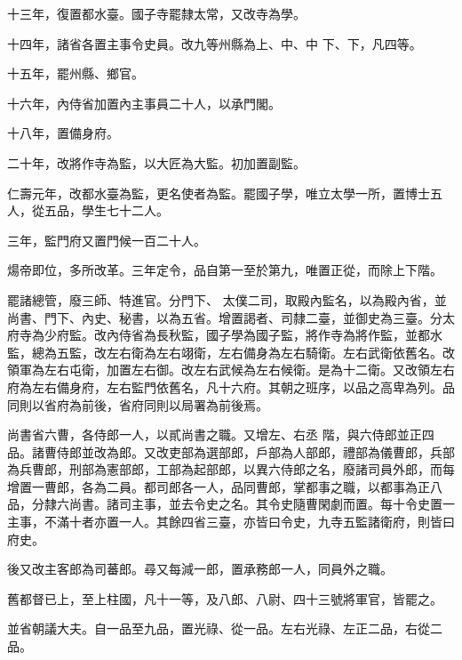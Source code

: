 \begin{pinyinscope}
 十三年，復置都水臺。國子寺罷隸太常，又改寺為學。



 十四年，諸省各置主事令史員。改九等州縣為上、中、中
 下、下，凡四等。



 十五年，罷州縣、鄉官。



 十六年，內侍省加置內主事員二十人，以承門閣。



 十八年，置備身府。



 二十年，改將作寺為監，以大匠為大監。初加置副監。



 仁壽元年，改都水臺為監，更名使者為監。罷國子學，唯立太學一所，置博士五人，從五品，學生七十二人。



 三年，監門府又置門候一百二十人。



 煬帝即位，多所改革。三年定令，品自第一至於第九，唯置正從，而除上下階。



 罷諸總管，廢三師、特進官。分門下、
 太僕二司，取殿內監名，以為殿內省，並尚書、門下、內史、秘書，以為五省。增置謁者、司隸二臺，並御史為三臺。分太府寺為少府監。改內侍省為長秋監，國子學為國子監，將作寺為將作監，並都水監，總為五監，改左右衛為左右翊衛，左右備身為左右騎衛。左右武衛依舊名。改領軍為左右屯衛，加置左右御。改左右武候為左右候衛。是為十二衛。又改領左右府為左右備身府，左右監門依舊名，凡十六府。其朝之班序，以品之高卑為列。品同則以省府為前後，省府同則以局署為前後焉。



 尚書省六曹，各侍郎一人，以貳尚書之職。又增左、右丞
 階，與六侍郎並正四品。諸曹侍郎並改為郎。又改吏部為選部郎，戶部為人部郎，禮部為儀曹郎，兵部為兵曹郎，刑部為憲部郎，工部為起部郎，以異六侍郎之名，廢諸司員外郎，而每增置一曹郎，各為二員。都司郎各一人，品同曹郎，掌都事之職，以都事為正八品，分隸六尚書。諸司主事，並去令史之名。其令史隨曹閑劇而置。每十令史置一主事，不滿十者亦置一人。其餘四省三臺，亦皆曰令史，九寺五監諸衛府，則皆曰府史。



 後又改主客郎為司蕃郎。尋又每減一郎，置承務郎一人，同員外之職。



 舊都督已上，至上柱國，凡十一等，及八郎、八尉、四十三號將軍官，皆罷之。



 並省朝議大夫。自一品至九品，置光祿、從一品。左右光祿、左正二品，右從二品。




\end{pinyinscope}
